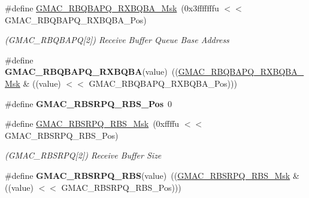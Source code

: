 \begin{DoxyCompactItemize}
\item 
\mbox{\label{group__SAME70__GMAC_gaefda0915b8771d7a034d9a973cfbbdff}} 
\#define \mbox{\hyperlink{group__SAME70__GMAC_gaefda0915b8771d7a034d9a973cfbbdff}{G\+M\+A\+C\+\_\+\+R\+B\+Q\+B\+A\+P\+Q\+\_\+\+R\+X\+B\+Q\+B\+A\+\_\+\+Msk}}~(0x3fffffffu $<$$<$ G\+M\+A\+C\+\_\+\+R\+B\+Q\+B\+A\+P\+Q\+\_\+\+R\+X\+B\+Q\+B\+A\+\_\+\+Pos)
\begin{DoxyCompactList}\small\item\em (G\+M\+A\+C\+\_\+\+R\+B\+Q\+B\+A\+PQ\mbox{[}2\mbox{]}) Receive Buffer Queue Base Address \end{DoxyCompactList}\item 
\mbox{\label{group__SAME70__GMAC_gae0f95359b25ee5113b25e2c389fcb301}} 
\#define {\bfseries G\+M\+A\+C\+\_\+\+R\+B\+Q\+B\+A\+P\+Q\+\_\+\+R\+X\+B\+Q\+BA}(value)~((\mbox{\hyperlink{group__SAMV71__GMAC_gaefda0915b8771d7a034d9a973cfbbdff}{G\+M\+A\+C\+\_\+\+R\+B\+Q\+B\+A\+P\+Q\+\_\+\+R\+X\+B\+Q\+B\+A\+\_\+\+Msk}} \& ((value) $<$$<$ G\+M\+A\+C\+\_\+\+R\+B\+Q\+B\+A\+P\+Q\+\_\+\+R\+X\+B\+Q\+B\+A\+\_\+\+Pos)))
\item 
\mbox{\label{group__SAME70__GMAC_ga5ce1f9e662c9e411d7564bd7e8f1e36d}} 
\#define {\bfseries G\+M\+A\+C\+\_\+\+R\+B\+S\+R\+P\+Q\+\_\+\+R\+B\+S\+\_\+\+Pos}~0
\item 
\mbox{\label{group__SAME70__GMAC_gaf1e9b5b1ebc73a018be02053c1229264}} 
\#define \mbox{\hyperlink{group__SAME70__GMAC_gaf1e9b5b1ebc73a018be02053c1229264}{G\+M\+A\+C\+\_\+\+R\+B\+S\+R\+P\+Q\+\_\+\+R\+B\+S\+\_\+\+Msk}}~(0xffffu $<$$<$ G\+M\+A\+C\+\_\+\+R\+B\+S\+R\+P\+Q\+\_\+\+R\+B\+S\+\_\+\+Pos)
\begin{DoxyCompactList}\small\item\em (G\+M\+A\+C\+\_\+\+R\+B\+S\+R\+PQ\mbox{[}2\mbox{]}) Receive Buffer Size \end{DoxyCompactList}\item 
\mbox{\label{group__SAME70__GMAC_ga9f3752162438d241d337ddf29a2a511f}} 
\#define {\bfseries G\+M\+A\+C\+\_\+\+R\+B\+S\+R\+P\+Q\+\_\+\+R\+BS}(value)~((\mbox{\hyperlink{group__SAMV71__GMAC_gaf1e9b5b1ebc73a018be02053c1229264}{G\+M\+A\+C\+\_\+\+R\+B\+S\+R\+P\+Q\+\_\+\+R\+B\+S\+\_\+\+Msk}} \& ((value) $<$$<$ G\+M\+A\+C\+\_\+\+R\+B\+S\+R\+P\+Q\+\_\+\+R\+B\+S\+\_\+\+Pos)))

\end{DoxyCompactItemize}

